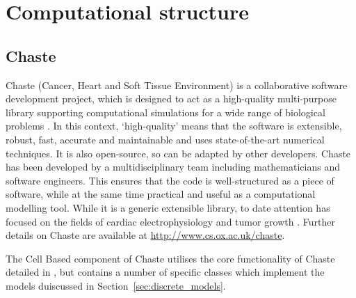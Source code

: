 \documentclass{siamltex}
\begin{document}
\section{Computational structure} \label{sec:computational_structure}


\subsection{Chaste} \label{sec:chaste} 
Chaste (Cancer, Heart and Soft Tissue Environment) is a collaborative software development project, which is designed to act as a high-quality multi-purpose library supporting computational simulations for a wide range of biological problems \citep{Pitt-Francis2008Chaste}. 
In this context, ‘high-quality’ means that the software is extensible, robust, fast, accurate and maintainable and uses state-of-the-art numerical techniques. 
It is also open-source, so can be adapted by other developers. 
Chaste has been developed by a multidisciplinary team including mathematicians and software engineers. 
This ensures that the code is well-structured as a piece of software, while at the same time practical and useful as a computational modelling tool. 
While it is a generic extensible library, to date attention has focused on the fields of cardiac electrophysiology and tumor growth \citep{Pitt-Francis2009Chaste}. 
Further details on Chaste are available at \url{http://www.cs.ox.ac.uk/chaste}. 

The Cell Based component of Chaste utilises the core functionality of Chaste detailed in \citep{Pitt-Francis2009Chaste}, but contains a number of specific classes which implement the models duiscussed in Section~\ref{sec:discrete_models}.

\end{document}
